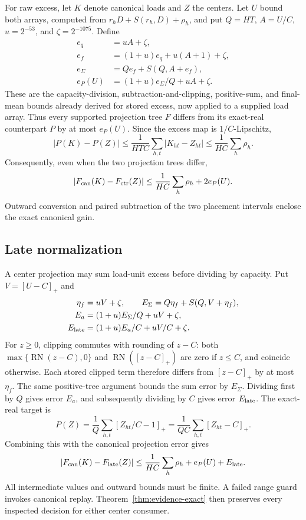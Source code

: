 \documentclass[11pt]{article}
\begin{document}
For raw excess, let $K$ denote canonical loads and $Z$ the centers. Let $U$ bound both arrays, computed from $r_hD+S(r_h,D)+\rho_h$, and put $Q=HT$, $A=U/C$, $u=2^{-53}$, and $\zeta=2^{-1075}$. Define
\begin{align}
e_q&=uA+\zeta,\nonumber\\
e_f&=(1+u)e_q+u(A+1)+\zeta,\nonumber\\
e_\Sigma&=Qe_f+S(Q,A+e_f),\nonumber\\
e_P(U)&=(1+u)e_\Sigma/Q+uA+\zeta.
\label{eq:center-projection-error}
\end{align}
These are the capacity-division, subtraction-and-clipping, positive-sum, and final-mean bounds already derived for stored excess, now applied to a supplied load array. Thus every supported projection tree $F$ differs from its exact-real counterpart $P$ by at most $e_P(U)$. Since the excess map is $1/C$-Lipschitz,
\begin{equation}
|P(K)-P(Z)|\le\frac1{HTC}\sum_{h,t}|K_{ht}-Z_{ht}|
\le\frac1{HC}\sum_h\rho_h.
\end{equation}
Consequently, even when the two projection trees differ,
\begin{equation}
|F_{\rm can}(K)-F_{\rm ctr}(Z)|\le\frac1{HC}\sum_h\rho_h+2e_P(U).
\label{eq:center-projection-radius}
\end{equation}
Outward conversion and paired subtraction of the two placement intervals enclose the exact canonical gain.

\subsection{Late normalization}
A center projection may sum load-unit excess before dividing by capacity. Put $V=[U-C]_+$ and
\begin{align}
\eta_f&=uV+\zeta,\qquad E_\Sigma=Q\eta_f+S(Q,V+\eta_f),\nonumber\\
E_a&=(1+u)E_\Sigma/Q+uV+\zeta,\nonumber\\
E_{\rm late}&=(1+u)E_a/C+uV/C+\zeta.
\label{eq:late-projection-error}
\end{align}
For $z\ge0$, clipping commutes with rounding of $z-C$: both $\max\{\operatorname{RN}(z-C),0\}$ and $\operatorname{RN}([z-C]_+)$ are zero if $z\le C$, and coincide otherwise. Each stored clipped term therefore differs from $[z-C]_+$ by at most $\eta_f$. The same positive-tree argument bounds the sum error by $E_\Sigma$. Dividing first by $Q$ gives error $E_a$, and subsequently dividing by $C$ gives error $E_{\rm late}$. The exact-real target is
\begin{equation}
P(Z)=\frac1Q\sum_{h,t}[Z_{ht}/C-1]_+=\frac1{QC}\sum_{h,t}[Z_{ht}-C]_+.
\end{equation}
Combining this with the canonical projection error gives
\begin{equation}
|F_{\rm can}(K)-F_{\rm late}(Z)|\le\frac1{HC}\sum_h\rho_h+e_P(U)+E_{\rm late}.
\end{equation}
All intermediate values and outward bounds must be finite. A failed range guard invokes canonical replay. Theorem~\ref{thm:evidence-exact} then preserves every inspected decision for either center consumer.
\end{document}
